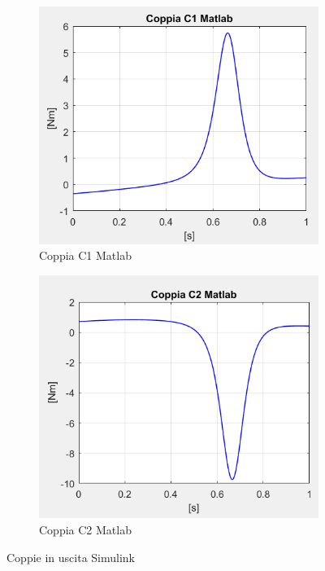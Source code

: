 \begin{figure}[!ht]
	\begin{subfigure}{.5\textwidth}
		\centering
		\includegraphics[width=.9\linewidth]{Immagini/Dinamica/c1matlab.png}  
		\caption{Coppia C1 Matlab}
		\label{fig:leggiC1M}
	\end{subfigure}
	\begin{subfigure}{.5\textwidth}
		\centering
		\includegraphics[width=.9\linewidth]{Immagini/Dinamica/c2matlab.png}  
		\caption{Coppia C2 Matlab}
		\label{fig:leggiC2M}
	\end{subfigure}
	\caption{Coppie in uscita Simulink}
\end{figure}

